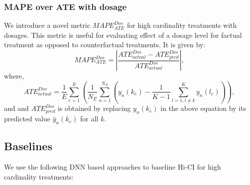 \documentclass[twoside,11pt]{article}
\begin{document}
\subsubsection{MAPE over ATE with dosage} We introduce a novel metric $MAPE_{ATE}^{Dos}$ for high cardinality treatments with dosages. This metric is useful for evaluating effect of a dosage level for factual treatment as opposed to counterfactual treatments.
It is given by:
\begin{equation}
    MAPE_{ATE}^{Dos} = \left|\frac{ATE_{actual}^{Dos} - ATE_{pred}^{Dos}}{ATE_{actual}^{Dos}}\right|,
\end{equation}
where,
\begin{equation}
    ATE_{actual}^{Dos} = \frac{1}{E}\sum_{e=1}^{E}\left(\frac{1}{N_{E}}\sum_{n=1}^{N_{E}}\left(y_{n}(k_e) - \frac{1}{K-1}\sum_{l=1, l \neq k}^{K}y_{n}(l_e)\right)\right),
\end{equation}
and and $ATE_{pred}^{Dos}$ is obtained by replacing $y_{n}(k_e)$ in the above equation by its predicted value $\hat{y}_{n}(k_e)$ for all $k$.



\subsection{Baselines}
\label{sec:baselines}
 We use the following DNN based approaches to baseline Hi-CI for high cardinality treatments: 
\end{document}
